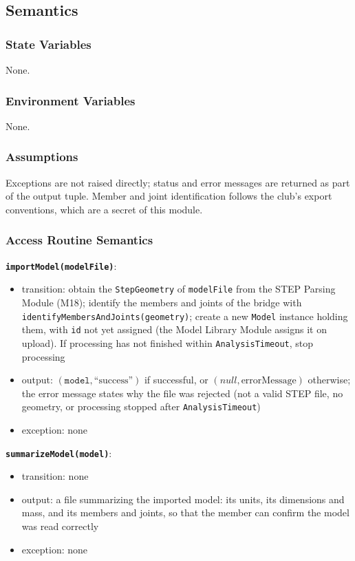 \documentclass[12pt, titlepage]{article}
\begin{document}
\subsection{Semantics}

\subsubsection{State Variables}
None.

\subsubsection{Environment Variables}
None.

\subsubsection{Assumptions}
Exceptions are not raised directly; status and error messages are returned as part of the output tuple. Member and joint identification follows the club's export conventions, which are a secret of this module.

\subsubsection{Access Routine Semantics}

\textbf{\texttt{importModel(modelFile)}}:
\begin{itemize}
  \item transition: obtain the \texttt{StepGeometry} of \texttt{modelFile} from the STEP Parsing Module (M18); identify the members and joints of the bridge with \texttt{identifyMembersAndJoints(geometry)}; create a new \texttt{Model} instance holding them, with \texttt{id} not yet assigned (the Model Library Module assigns it on upload). If processing has not finished within \texttt{Analysis\allowbreak Timeout}, stop processing
  \item output: $(\texttt{model}, \text{``success''})$ if successful, or $(\textit{null}, \text{errorMessage})$ otherwise; the error message states why the file was rejected (not a valid STEP file, no geometry, or processing stopped after \texttt{Analysis\allowbreak Timeout})
  \item exception: none
\end{itemize}

\textbf{\texttt{summarizeModel(model)}}:
\begin{itemize}
  \item transition: none
  \item output: a file summarizing the imported model: its units, its dimensions and mass, and its members and joints, so that the member can confirm the model was read correctly
  \item exception: none
\end{itemize}
\end{document}
